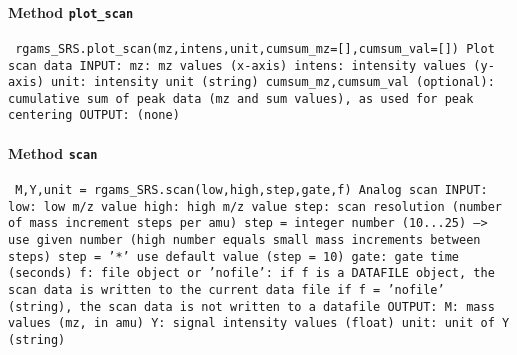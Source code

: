 \paragraph{Method \texttt{plot_scan}}
\vspace{1ex}
\texttt{\newline
rgams_SRS.plot_scan(mz,intens,unit,cumsum_mz=[],cumsum_val=[])\newline
\newline
Plot scan data\newline
\newline
INPUT:\newline
mz: mz values (x-axis)\newline
intens: intensity values (y-axis)\newline
unit: intensity unit (string)\newline
cumsum_mz,cumsum_val (optional): cumulative sum of peak data (mz and sum values), as used for peak centering\newline
\newline
OUTPUT:\newline
(none)\newline
\newline
}

\paragraph{Method \texttt{scan}}
\vspace{1ex}
\texttt{\newline
M,Y,unit = rgams_SRS.scan(low,high,step,gate,f)\newline
\newline
Analog scan\newline
\newline
INPUT:\newline
low: low m/z value\newline
high: high m/z value\newline
step: scan resolution (number of mass increment steps per amu)\newline
step = integer number (10...25) --> use given number (high number equals small mass increments between steps)\newline
step = '*' use default value (step = 10)\newline
gate: gate time (seconds)\newline
f: file object or 'nofile':\newline
if f is a DATAFILE object, the scan data is written to the current data file\newline
if f = 'nofile' (string), the scan data is not written to a datafile\newline
\newline
OUTPUT:\newline
M: mass values (mz, in amu)\newline
Y: signal intensity values (float)\newline
unit: unit of Y (string)\newline
\newline
}

